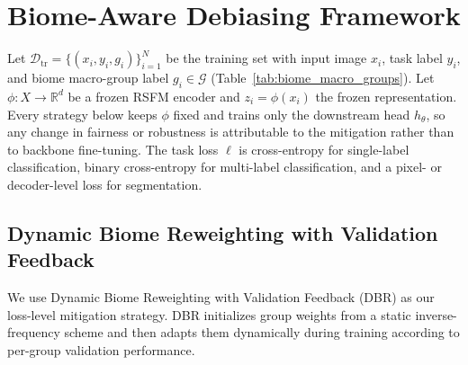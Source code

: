 \documentclass[10pt,twocolumn,letterpaper]{article}
\begin{document}
\section{Biome-Aware Debiasing Framework}

Let \(\mathcal{D}_{\mathrm{tr}}=\{(x_i,y_i,g_i)\}_{i=1}^{N}\) be the training set with input image \(x_i\), task label \(y_i\), and biome macro-group label \(g_i\in\mathcal{G}\) (Table~\ref{tab:biome_macro_groups}). Let \(\phi:X\rightarrow\mathbb{R}^{d}\) be a frozen RSFM encoder and \(z_i=\phi(x_i)\) the frozen representation. Every strategy below keeps \(\phi\) fixed and trains only the downstream head \(h_\theta\), so any change in fairness or robustness is attributable to the mitigation rather than to backbone fine-tuning. The task loss \(\ell\) is cross-entropy for single-label classification, binary cross-entropy for multi-label classification, and a pixel- or decoder-level loss for segmentation.

\subsection{Dynamic Biome Reweighting with Validation Feedback}

We use Dynamic Biome Reweighting with Validation Feedback (DBR) as our loss-level mitigation strategy. DBR initializes group weights from a static inverse-frequency scheme and then adapts them dynamically during training according to per-group validation performance.
\end{document}
